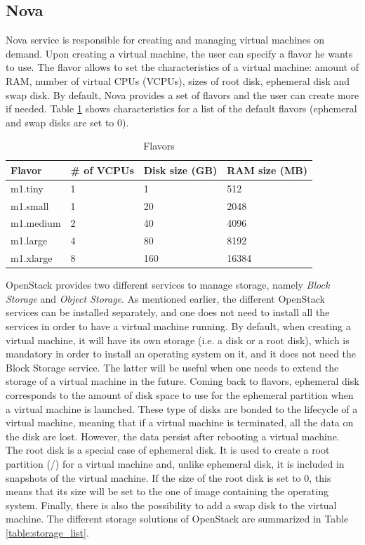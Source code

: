 \subsection{Nova}
Nova service is responsible for creating and managing virtual machines on demand.
Upon creating a virtual machine, the user can specify a flavor he wants to use.
The flavor allows to set the characteristics of a virtual machine: amount of RAM, number of virtual CPUs (VCPUs), sizes of root disk, ephemeral disk and swap disk. By default, Nova provides a set of flavors and the user can create more if needed.
Table \ref{table:flavors_list} shows characteristics for a list of the default flavors (ephemeral and swap disks are set to 0).

\begin{table}[h]
	\centering
	\begin{tabular}{|l|l|l|l|}
		\hline
		\textbf{Flavor} & \textbf{# of VCPUs} & \textbf{Disk size (GB)} & \textbf{RAM size (MB)}\\
		\hline
		m1.tiny & 1 & 1 & 512 \\
		m1.small & 1 & 20 & 2048 \\
		m1.medium & 2 & 40 & 4096 \\
		m1.large & 4 & 80 & 8192 \\
		m1.xlarge & 8 & 160 & 16384 \\
		\hline
	\end{tabular}
	\caption{Flavors}
	\label{table:flavors_list}
\end{table}

OpenStack provides two different services to manage storage, namely \textit{Block Storage} and \textit{Object Storage}.
As mentioned earlier, the different OpenStack services can be installed separately, and one does not need to install all the services in order to have a virtual machine running.
By default, when creating a virtual machine, it will have its own storage (i.e. a disk or a root disk), which is mandatory in order to install an operating system on it,
and it does not need the Block Storage service. 
The latter will be useful when one needs to extend the storage of a virtual machine in the future. 
Coming back to flavors, ephemeral disk corresponds to the amount of disk space to use for the ephemeral partition when a virtual machine is launched. 
These type of disks are bonded to the lifecycle of a virtual machine, meaning that if a virtual machine is terminated, all the data on the disk are lost. 
However, the data persist after rebooting a virtual machine. 
The root disk is a special case of ephemeral disk. 
It is used to create a root partition (/) for a virtual machine and, unlike ephemeral disk, it is included in snapshots of the virtual machine. 
If the size of the root disk is set to 0, this means that its size will be set to the one of image containing the operating system.
Finally, there is also the possibility to add a swap disk to the virtual machine.
The different storage solutions of OpenStack are summarized in Table \ref{table:storage_list}.

